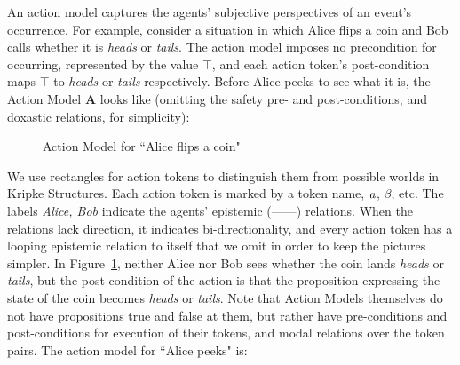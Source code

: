 An action model captures the agents' subjective perspectives of an event's occurrence. For example, consider a situation in which Alice flips a coin and Bob calls whether it is \emph{heads} or \emph{tails}. The action model imposes no precondition for occurring, represented by the value $\top$, and each action token's post-condition maps $\top$ to \emph{heads} or \emph{tails} respectively. Before Alice peeks to see what it is, the Action Model $\mathbf{A}$ looks like (omitting the safety pre- and post-conditions, and doxastic relations, for simplicity):
\begin{figure}[H]
\begin{center}
\end{center}
\caption{Action Model for ``Alice flips a coin"}
\label{fig: flip}
\end{figure}
We use rectangles for action tokens to distinguish them from possible worlds in Kripke Structures. Each action token is marked by a token name, $\mathit{a}$, $\beta$, etc. The labels \emph{Alice, Bob} indicate the agents' epistemic (------) relations. When the relations lack direction, it indicates bi-directionality, and every action token has a looping epistemic relation to itself that we omit in order to keep the pictures simpler. In Figure~\ref{fig: flip}, neither Alice nor Bob sees whether the coin lands \emph{heads} or \emph{tails}, but the post-condition of the action is that the proposition expressing the state of the coin becomes \emph{heads} or \emph{tails}. Note that Action Models themselves do not have propositions true and false at them, but rather have pre-conditions and post-conditions for execution of their tokens, and modal relations over the token pairs. The action model for ``Alice peeks" is:

